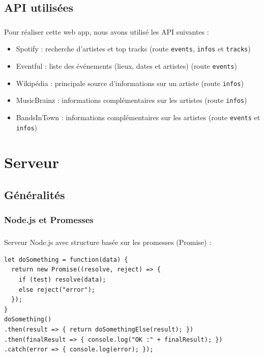 \documentclass[10pt]{beamer}
\begin{document}
\subsection{API utilisées}
\begin{frame}
	\frametitle{\secname}
	\framesubtitle{\subsecname}
	Pour réaliser cette web app, nous avons utilisé les API suivantes :
	\begin{itemize}
		\item Spotify : recherche d'artistes et top tracks (route \texttt{events}, \texttt{infos} et \texttt{tracks})
		\item Eventful : liste des événements (lieux, dates et artistes) (route \texttt{events})
		\item Wikipédia : principale source d'informations sur un artiste (route \texttt{infos})
        \item MusicBrainz : informations complémentaires sur les artistes (route \texttt{infos})
		\item BandsInTown : informations complémentaires sur les artistes (route \texttt{events} et \texttt{infos})
	\end{itemize}
\end{frame}

\section{Serveur}
\subsection{Généralités}
\subsubsection{Node.js et Promesses}
\begin{frame}[fragile]
	\frametitle{\secname}
	\framesubtitle{\subsubsecname}
	Serveur Node.js avec structure basée sur les promesses (Promise) :
	\begin{verbatim}
let doSomething = function(data) {
  return new Promise((resolve, reject) => {
    if (test) resolve(data);
    else reject("error");
  });
}
doSomething()
.then(result => { return doSomethingElse(result); })
.then(finalResult => { console.log("OK :" + finalResult); })
.catch(error => { console.log(error); });
	\end{verbatim}
\end{frame}
\end{document}

